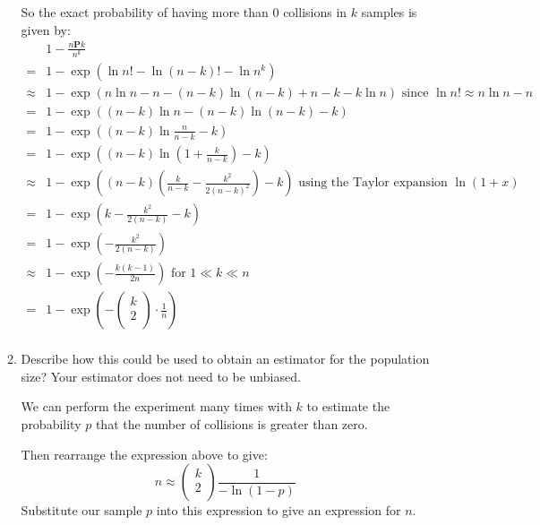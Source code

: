 \documentclass[10pt,\jkfside,a4paper]{article}
\begin{document}
\begin{enumerate}
\begin{enumerate}
So the exact probability of having more than 0 collisions in $k$ samples is given by:
\[
\begin{split}
& 1 - \frac{n\mathbf{P}k}{n^k} \\
=& 1 - \exp{\left(\ln n! - \ln (n - k)! - \ln n^k\right)} \\
\approx& 1 - \exp{\left(n\ln n - n - (n - k)\ln (n - k) + n - k - k\ln n\right)} \text{ since } \ln n! \approx n \ln
n - n\\
=& 1 - \exp{\left((n - k)\ln n - (n - k)\ln (n - k) - k\right)} \\
=& 1 - \exp{\left((n - k)\ln \frac{n}{n - k} - k\right)} \\
=& 1 - \exp{\left((n - k)\ln \left(1 + \frac{k}{n - k}\right) - k\right)} \\
\approx& 1 - \exp{\left((n - k)\left(\frac{k}{n - k} - \frac{k^2}{2(n - k)^2}\right) - k\right)} \text{ using the Taylor
 expansion } \ln (1 + x)\\
=& 1 - \exp{\left(k - \frac{k^2}{2(n - k)} - k\right)} \\
=& 1 - \exp{\left(-\frac{k^2}{2(n - k)}\right)} \\
\approx& 1 - \exp{\left(- \frac{k(k - 1)}{2n}\right)} \text{ for } 1 \ll k \ll n \\
=& 1 - \exp{\left(-\begin{pmatrix} k \\ 2 \\ \end{pmatrix} \cdot \frac{1}{n}\right)} \\
\end{split}
\]

\item Describe how this could be used to obtain an estimator for the population size?
Your estimator does not need to be unbiased.

We can perform the experiment many times with $k$ to estimate the probability $p$ that
the number of collisions is greater than zero.

Then rearrange the expression above to give:
\[
n \approx \begin{pmatrix} k \\ 2 \\ \end{pmatrix} \frac{1}{-\ln(1 - p)}
\]
Substitute our sample $p$ into this expression to give an expression for $n$.

\end{enumerate}

\setcounter{enumi}{2}


\end{enumerate}
\end{document}

